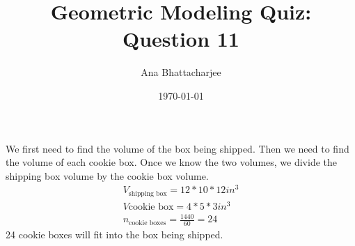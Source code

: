 \documentclass{article}
\begin{document}
\title{Geometric Modeling Quiz: Question 11}
\author{Ana Bhattacharjee}
\date{\today}
\maketitle

\begin{center}
We first need to find the volume of the box being shipped. Then we need to find the volume of each cookie box. Once we know the two volumes, we divide the shipping box volume by the cookie box volume.
\begin{align}
  V_{\text{shipping box}} = 12 * 10 * 12 in^3 \\
  V{\text{cookie box}} = 4 * 5 * 3 in^3 \\
  n_{\text{cookie boxes}} = \frac{1440}{60} = 24
\end{align}
24 cookie boxes will fit into the box being shipped. 
\end{center}
\end{document}
